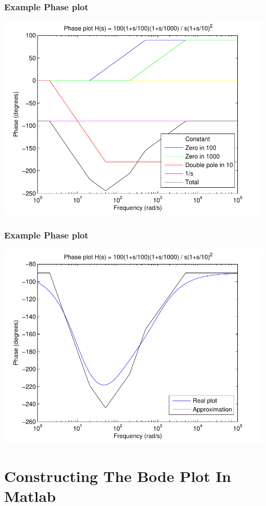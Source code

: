 \begin{frame}
\frametitle{Example Phase plot}
\includegraphics[scale=0.5]{PhaseParts}

\end{frame}

\begin{frame}
\frametitle{Example Phase plot}
\includegraphics[scale=0.5]{PhaseApprox}

\end{frame}

\section{Constructing The Bode Plot In Matlab}

